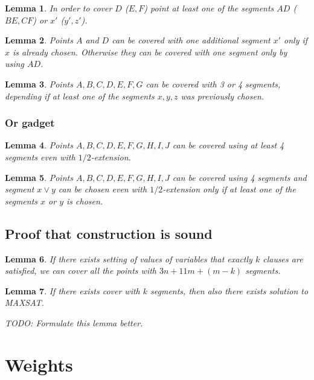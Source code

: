 \documentclass[en]{pracamgr}
\newtheorem{lemma}{Lemma}[section]
\begin{document}
\begin{lemma}
In order to cover $D$ ($E, F$) point at least one
of the segments $AD$ ($BE, CF$) or $x'$ ($y', z'$).
\end{lemma}

\begin{lemma}
Points $A$ and $D$ can be covered
with one additional segment $x'$
only if $x$ is already chosen.
Otherwise they can be covered with one segment
only by using $AD$.
\end{lemma}

\begin{lemma}
Points $A, B, C, D, E, F, G$ can be covered with 
3 or 4 segments, depending if at least one of the segments
$x, y, z$ was previously chosen.
\end{lemma}

\subsubsection{Or gadget}
\begin{lemma}
Points $A, B, C, D, E, F, G, H, I, J$ can be covered using
at least 4 segments even with $1/2$-extension.
\end{lemma}

\begin{lemma}
Points $A, B, C, D, E, F, G, H, I, J$ can be covered using
4 segments and segment $x \lor y$ can be chosen
even with $1/2$-extension
only if at least one of the segments $x$ or $y$ is chosen.
\end{lemma}

\subsection{Proof that construction is sound}
\begin{lemma}
If there exists setting of values of variables that exactly $k$
clauses are satisfied, we can cover all the points
with $3n + 11m + (m-k)$ segments.
\end{lemma}

\begin{lemma}
If there exists cover with $k$ segments,
then also there exists solution to MAXSAT.

TODO: Formulate this lemma better.
\end{lemma}

\section{Weights}
\end{document}
